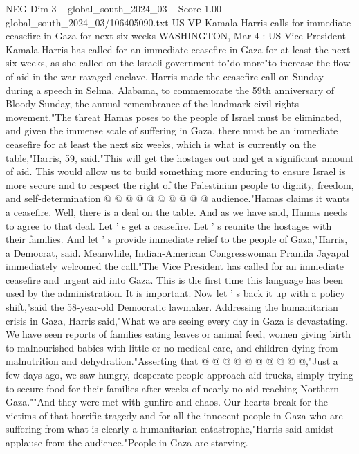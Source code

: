 \begin{textsample}{NEG Dim 3 – global\_south\_2024\_03 – Score 1.00 – global\_south\_2024\_03/106405090.txt}  \label{ex:f3_neg_040}
US VP Kamala Harris calls for immediate ceasefire in Gaza for next six weeks WASHINGTON, Mar 4 : US Vice President Kamala Harris has called for an immediate ceasefire in Gaza for at least the next six weeks, as she called on the Israeli government to"do more"to increase the flow of aid in the war-ravaged enclave.
Harris made the ceasefire call on Sunday during a speech in Selma, Alabama, to commemorate the 59th anniversary of Bloody Sunday, the annual remembrance of the landmark civil rights movement."The threat Hamas poses to the people of Israel must be eliminated, and given the immense scale of suffering in Gaza, there must be an immediate ceasefire for at least the next six weeks, which is what is currently on the table,"Harris, 59, said."This will get the hostages out and get a significant amount of aid.
This would allow us to build something more enduring to ensure Israel is more secure and to respect the right of the Palestinian people to dignity, freedom, and self-determination @ @ @ @ @ @ @ @ @ @ audience."Hamas claims it wants a ceasefire.
Well, there is a deal on the table.
And as we have said, Hamas needs to agree to that deal.
Let ' s get a ceasefire.
Let ' s reunite the hostages with their families.
And let ' s provide immediate relief to the people of Gaza,"Harris, a Democrat, said.
Meanwhile, Indian-American Congresswoman Pramila Jayapal immediately welcomed the call."The Vice President has called for an immediate ceasefire and urgent aid into Gaza.
This is the first time this language has been used by the administration.
It is important.
Now let ' s back it up with a policy shift,"said the 58-year-old Democratic lawmaker.
Addressing the humanitarian crisis in Gaza, Harris said,"What we are seeing every day in Gaza is devastating.
We have seen reports of families eating leaves or animal feed, women giving birth to malnourished babies with little or no medical care, and children dying from malnutrition and dehydration."Asserting that @ @ @ @ @ @ @ @ @ @,"Just a few days ago, we saw hungry, desperate people approach aid trucks, simply trying to secure food for their families after weeks of nearly no aid reaching Northern Gaza.""And they were met with gunfire and chaos.
Our hearts break for the victims of that horrific tragedy and for all the innocent people in Gaza who are suffering from what is clearly a humanitarian catastrophe,"Harris said amidst applause from the audience."People in Gaza are starving.

\end{textsample}
